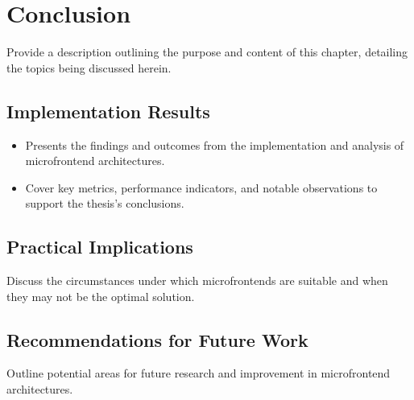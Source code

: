 \chapter{Conclusion}
\label{chap:Conclusion}
Provide a description outlining the purpose and content of this chapter, detailing the topics being discussed herein.

\section{Implementation Results}
\begin{itemize}
   \item Presents the findings and outcomes from the implementation and analysis of microfrontend architectures.
   \item Cover key metrics, performance indicators, and notable observations to support the thesis's conclusions.
\end{itemize}

\section{Practical Implications}
Discuss the circumstances under which microfrontends are suitable and when they may not be the optimal solution.

\section{Recommendations for Future Work}
Outline potential areas for future research and improvement in microfrontend architectures.

\cite{Oetiker2000}